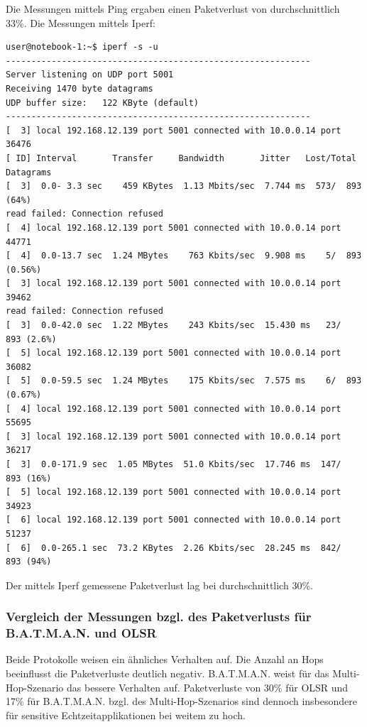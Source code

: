 \documentclass[a4paper,10pt]{article}
\begin{document}
Die Messungen mittels Ping ergaben einen Paketverlust von durchschnittlich 33\%. 
Die Messungen mittels Iperf:

\begin{lstlisting}
user@notebook-1:~$ iperf -s -u
------------------------------------------------------------
Server listening on UDP port 5001
Receiving 1470 byte datagrams
UDP buffer size:   122 KByte (default)
------------------------------------------------------------
[  3] local 192.168.12.139 port 5001 connected with 10.0.0.14 port 36476
[ ID] Interval       Transfer     Bandwidth       Jitter   Lost/Total Datagrams
[  3]  0.0- 3.3 sec    459 KBytes  1.13 Mbits/sec  7.744 ms  573/  893 (64%)
read failed: Connection refused
[  4] local 192.168.12.139 port 5001 connected with 10.0.0.14 port 44771
[  4]  0.0-13.7 sec  1.24 MBytes    763 Kbits/sec  9.908 ms    5/  893 (0.56%)
[  3] local 192.168.12.139 port 5001 connected with 10.0.0.14 port 39462
read failed: Connection refused
[  3]  0.0-42.0 sec  1.22 MBytes    243 Kbits/sec  15.430 ms   23/  893 (2.6%)
[  5] local 192.168.12.139 port 5001 connected with 10.0.0.14 port 36082
[  5]  0.0-59.5 sec  1.24 MBytes    175 Kbits/sec  7.575 ms    6/  893 (0.67%)
[  4] local 192.168.12.139 port 5001 connected with 10.0.0.14 port 55695
[  3] local 192.168.12.139 port 5001 connected with 10.0.0.14 port 36217
[  3]  0.0-171.9 sec  1.05 MBytes  51.0 Kbits/sec  17.746 ms  147/  893 (16%)
[  5] local 192.168.12.139 port 5001 connected with 10.0.0.14 port 34923
[  6] local 192.168.12.139 port 5001 connected with 10.0.0.14 port 51237
[  6]  0.0-265.1 sec  73.2 KBytes  2.26 Kbits/sec  28.245 ms  842/  893 (94%)
\end{lstlisting}

Der mittels Iperf gemessene Paketverlust lag bei durchschnittlich 30\%.

\subsubsection{Vergleich der Messungen bzgl. des Paketverlusts für B.A.T.M.A.N. und OLSR}

Beide Protokolle weisen ein ähnliches Verhalten auf. 
Die Anzahl an Hops beeinflusst die Paketverluste deutlich negativ.
B.A.T.M.A.N. weist für das Multi-Hop-Szenario das bessere Verhalten auf.
Paketverluste von 30\% für OLSR und 17\% für B.A.T.M.A.N. bzgl. des Multi-Hop-Szenarios sind dennoch insbesondere für sensitive Echtzeitapplikationen bei weitem zu hoch.

%
%
%
%
%
%
%
\end{document}
